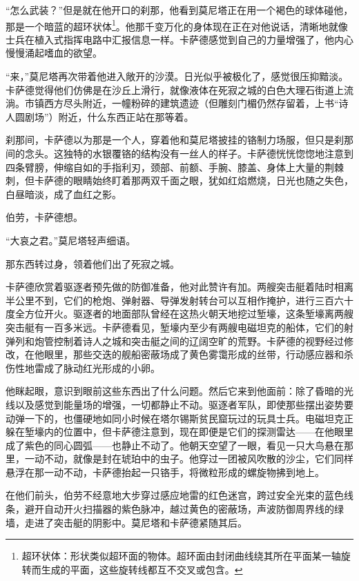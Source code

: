 \documentclass[AutoFakeBold=true]{book}
\begin{document}
``怎么武装？''但是就在他开口的刹那，他看到莫尼塔正在用一个褐色的球体碰他，那是一个暗蓝的超环状体\footnote{超环状体：形状类似超环面的物体。超环面由封闭曲线绕其所在平面某一轴旋转而生成的平面，这些旋转线都互不交叉或包含。}。他那千变万化的身体现在正在对他说话，清晰地就像士兵在植入式指挥电路中汇报信息一样。卡萨德感觉到自己的力量增强了，他内心慢慢涌起嗜血的欲望。

``来，''莫尼塔再次带着他进入敞开的沙漠。日光似乎被极化了，感觉很压抑黯淡。卡萨德觉得他们仿佛是在沙丘上滑行，就像液体在死寂之城的白色大理石街道上流淌。市镇西方尽头附近，一幢粉碎的建筑遗迹（但雕刻门楣仍然存留着，上书``诗人圆剧场''）附近，什么东西正站在那等着。

刹那间，卡萨德以为那是一个人，穿着他和莫尼塔披挂的铬制力场服，但只是刹那间的念头。这独特的水银覆铬的结构没有一丝人的样子。卡萨德恍恍惚惚地注意到四条臂膀，伸缩自如的手指利刃，颈部、前额、手腕、膝盖、身体上大量的荆棘刺，但卡萨德的眼睛始终盯着那两双千面之眼，犹如红焰燃烧，日光也随之失色，白昼暗淡，成了血红之影。

{\kaishu 伯劳}，卡萨德想。

``大哀之君。''莫尼塔轻声细语。

那东西转过身，领着他们出了死寂之城。

\vspace*{1em}

卡萨德欣赏着驱逐者预先做的防御准备，他对此赞许有加。两艘突击艇着陆时相离半公里不到，它们的枪炮、弹射器、导弹发射转台可以互相作掩护，进行三百六十度全方位开火。驱逐者的地面部队曾经在这热火朝天地挖过堑壕，这条堑壕离两艘突击艇有一百多米远。卡萨德看见，堑壕内至少有两艘电磁坦克的船体，它们的射弹列和炮管控制着诗人之城和突击艇之间的辽阔空旷的荒野。卡萨德的视野经过修改，在他眼里，那些交迭的舰船密蔽场成了黄色雾霭形成的丝带，行动感应器和杀伤性地雷成了脉动红光形成的小卵。

他眯起眼，意识到眼前这些东西出了什么问题。然后它来到他面前：除了昏暗的光线以及感觉到能量场的增强，一切都静止不动。驱逐者军队，即使那些摆出姿势要动弹一下的，也僵硬地如同小时候在塔尔锡斯贫民窟玩过的玩具士兵。电磁坦克正躲在堑壕内的位置中，但卡萨德注意到，现在即便是它们的探测雷达——在他眼里成了紫色的同心圆弧——也静止不动了。他朝天空望了一眼，看见一只大鸟悬在那里，一动不动，就像是封在琥珀中的虫子。他穿过一团被风吹散的沙尘，它们同样悬浮在那一动不动，卡萨德抬起一只铬手，将微粒形成的螺旋物拂到地上。

在他们前头，伯劳不经意地大步穿过感应地雷的红色迷宫，跨过安全光束的蓝色线条，避开自动开火扫描器的紫色脉冲，越过黄色的密蔽场，声波防御周界线的绿墙，走进了突击艇的阴影中。莫尼塔和卡萨德紧随其后。
\end{document}
